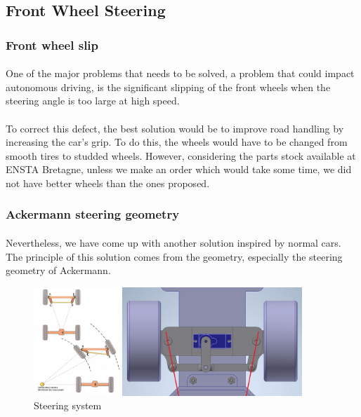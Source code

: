 \subsection{Front Wheel Steering}

\subsubsection{Front wheel slip}
\paragraph{}
One of the major problems that needs to be solved, a problem that could impact
autonomous driving, is the significant slipping of the front wheels when the steering
angle is too large  at high speed.

\paragraph{}
To correct this defect, the best solution would be to improve road handling by
increasing the car's grip. To do this, the wheels would have to be changed from
smooth tires to studded wheels.
However, considering the parts stock available at ENSTA Bretagne, unless we
make an order which would take some time, we did not have better wheels than the
ones proposed.

\subsubsection{Ackermann steering geometry}
\paragraph{}
Nevertheless, we have come up with another solution inspired by normal cars.
The principle of this solution comes from the geometry, especially the steering
geometry of Ackermann.

\begin{figure}[!ht]
    \begin{center}
        \includegraphics[width=0.9\textwidth]{Images/steering.jpg}
    \end{center}
    \caption{Steering system}
    \label{fig:steering}
\end{figure}

